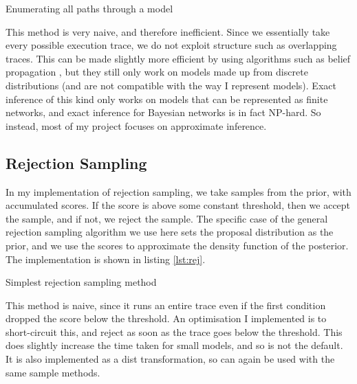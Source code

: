 \begin{listing}[ht]
	\caption{Enumerating all paths through a model}
	\label{lst:enum}
\end{listing}
	
This method is very naive, and therefore inefficient. Since we essentially take every possible execution trace, we do not exploit structure such as overlapping traces. This can be made slightly more efficient by using algorithms such as belief propagation \cite{belief-prop}, but they still only work on models made up from discrete distributions (and are not compatible with the way I represent models). Exact inference of this kind only works on models that can be represented as finite networks, and exact inference for Bayesian networks is in fact NP-hard\cite{cooper1990computational}. So instead, most of my project focuses on approximate inference.
	
\subsection{Rejection Sampling} \label{sec:rej}
In my implementation of rejection sampling, we take samples from the prior, with accumulated scores. If the score is above some constant threshold, then we accept the sample, and if not, we reject the sample. The specific case of the general rejection sampling algorithm we use here sets the proposal distribution as the prior, and we use the scores to approximate the density function of the posterior. The implementation is shown in listing \ref{lst:rej}.

\begin{listing}[!htb]
	\centering
	\caption{Simplest rejection sampling method}
	\label{lst:rej}
\end{listing}

This method is naive, since it runs an entire trace even if the first condition dropped the score below the threshold. An optimisation I implemented is to short-circuit this, and reject as soon as the trace goes below the threshold. This does slightly increase the time taken for small models, and so is not the default. It is also implemented as a dist transformation, so can again be used with the same sample methods.

